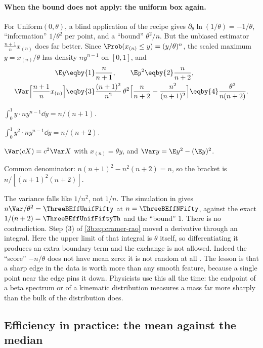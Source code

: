 \paragraph{When the bound does not apply: the uniform box again.}
For $\mathrm{Uniform}(0,\theta)$, a blind application of the recipe gives
$\partial_\theta\ln(1/\theta)=-1/\theta$, ``information'' $1/\theta^2$ per
point, and a ``bound'' $\theta^2/n$. But the unbiased estimator
$\tfrac{n+1}{n}x_{(n)}$ does far better. Since
$\Prob(x_{(n)}\le y)=(y/\theta)^n$, the scaled maximum $y=x_{(n)}/\theta$
has density $ny^{n-1}$ on $[0,1]$, and
\begin{align*}
  \E y&\eqby{1}\frac{n}{n+1},\qquad
  \E y^2\eqby{2}\frac{n}{n+2},\\
  \Var\Bigl[\frac{n+1}{n}x_{(n)}\Bigr]
  &\eqby{3}\frac{(n+1)^2}{n^2}\,\theta^2\Bigl[\frac{n}{n+2}-\frac{n^2}{(n+1)^2}\Bigr]
  \eqby{4}\frac{\theta^2}{n(n+2)} .
\end{align*}
\begin{explain}
  \item $\int_0^1y\cdot ny^{n-1}\dd y=n/(n+1)$.
  \item $\int_0^1y^2\cdot ny^{n-1}\dd y=n/(n+2)$.
  \item $\Var(cX)=c^2\Var X$ with $x_{(n)}=\theta y$, and
        $\Var y=\E y^2-(\E y)^2$.
  \item Common denominator:
        $n(n+1)^2-n^2(n+2)=n$, so the bracket is $n/[(n+1)^2(n+2)]$.
\end{explain}
The variance falls like $1/n^2$, not $1/n$. The simulation in
 gives $n\Var/\theta^2=\ThreeBEffUnifFifty$ at
$n=\ThreeBEffNFifty$, against the exact $1/(n+2)=\ThreeBEffUnifFiftyTh$ and
the ``bound'' $1$. There is no contradiction. Step (3) of
\eqref{3b:eq:cramer-rao} moved a derivative through an integral. Here the
upper limit of that integral is $\theta$ itself, so differentiating it
produces an extra boundary term and the exchange is not allowed. Indeed the
``score'' $-n/\theta$ does not have mean zero: it is not random at all
. The lesson is that a sharp edge in the
data is worth more than any smooth feature, because a single point near the
edge pins it down. Physicists use this all the time: the endpoint of a
beta spectrum or of a kinematic distribution measures a mass far more
sharply than the bulk of the distribution does.

\subsection{Efficiency in practice: the mean against the median}
\label{3b:sec:efficiency}

